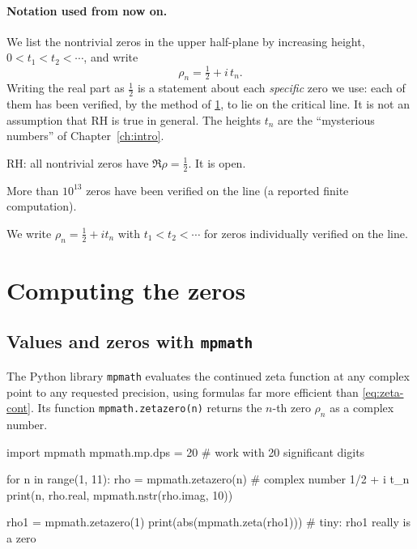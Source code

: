 \paragraph{Notation used from now on.} We list the nontrivial zeros in the upper half-plane by increasing height, $0<t_1<t_2<\cdots$, and write
\[
\rho_n=\tfrac12+i\,t_n .
\]
Writing the real part as $\tfrac12$ is a statement about each \emph{specific} zero we use: each of them has been verified, by the method of \cref{sec:zeta-computing}, to lie on the critical line. It is not an assumption that RH is true in general. The heights $t_n$ are the ``mysterious numbers'' of Chapter~\ref{ch:intro}.

\begin{keyideas}
\item RH: all nontrivial zeros have $\Re\rho=\tfrac12$. It is open.
\item More than $10^{13}$ zeros have been verified on the line (a reported finite computation).
\item We write $\rho_n=\tfrac12+it_n$ with $t_1<t_2<\cdots$ for zeros individually verified on the line.
\end{keyideas}

\section{Computing the zeros}\label{sec:zeta-computing}

\subsection{Values and zeros with \texttt{mpmath}}

The Python library \texttt{mpmath} evaluates the continued zeta function at any complex point to any requested precision, using formulas far more efficient than \cref{eq:zeta-cont}. Its function \texttt{mpmath.zetazero(n)} returns the $n$-th zero $\rho_n$ as a complex number.

\begin{pycode}
import mpmath
mpmath.mp.dps = 20                 # work with 20 significant digits

for n in range(1, 11):
    rho = mpmath.zetazero(n)       # complex number 1/2 + i t_n
    print(n, rho.real, mpmath.nstr(rho.imag, 10))

rho1 = mpmath.zetazero(1)
print(abs(mpmath.zeta(rho1)))      # tiny: rho1 really is a zero
\end{pycode}

